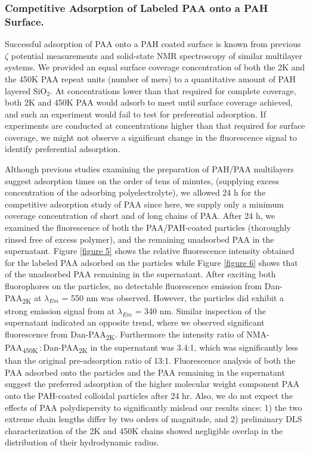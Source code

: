 \documentclass[twoside,twocolumn,9pt]{article}
\begin{document}
\subsubsection{Competitive Adsorption of Labeled PAA onto a PAH Surface.}   %
    \label{sec-res-compet}


Successful adsorption of PAA onto a PAH coated surface is known from previous $\zeta$ potential measurements and solid-state NMR spectroscopy of similar multilayer systems.\cite{Burke2003,Smith2004}  We provided an equal surface coverage concentration of both the 2K and the 450K PAA repeat units (number of mers) to a quantitative amount of PAH layered SiO$_2$.  At concentrations lower than that required for complete coverage, both 2K and 450K PAA would adsorb to meet until surface coverage achieved, and such an experiment would fail to test for preferential adsorption.  If experiments are conducted at concentrations higher than that required for surface coverage, we might not observe a significant change in the 
fluorescence signal to identify preferential adsorption. 


Although previous studies examining the preparation of PAH/PAA multilayers suggest adsorption times on the order of tens of minutes, (supplying excess concentration of the adsorbing polyelectrolyte), we allowed 24 h for the competitive adsorption study of PAA since here, we supply only a minimum coverage concentration of short and of long chains of PAA.  After 24 h, we examined the fluorescence of both the PAA/PAH-coated particles (thoroughly rinsed free of excess polymer), and the remaining unadsorbed PAA in the supernatant.  Figure \ref{figure 5} shows the relative fluorescence intensity obtained for the labeled PAA adsorbed on the particles while Figure \ref{figure 6} shows that of the unadsorbed PAA remaining in the supernatant.  After exciting both fluorophores on the particles, no detectable fluorescence emission from Dan-PAA\textsubscript{2K} at $\lambda_{Em}$ = 550 nm was observed.  However, the particles did exhibit a strong emission signal from at $\lambda_{Em}$ = 340 nm.  Similar inspection of the supernatant indicated an opposite trend, where we observed significant fluorescence from Dan-PAA\textsubscript{2K}.  Furthermore the intensity ratio of NMA-PAA\textsubscript{450K}\,:\,Dan-PAA\textsubscript{2K} in the supernatant was 3.4:1, which was significantly less than the original pre-adsorption ratio of 13:1.  Fluorescence analysis of both the PAA adsorbed 
onto the particles and the PAA remaining in the supernatant suggest the preferred adsorption of the higher molecular weight component PAA onto the PAH-coated colloidal particles after 24 hr.  Also, we do not expect the effects of PAA polydispersity to significantly mislead our results since: 1) the two extreme chain lengths differ by two orders of magnitude, and 2) preliminary DLS characterization of the 2K and 450K chains showed negligible overlap in the distribution of their hydrodynamic radius.
\end{document}
